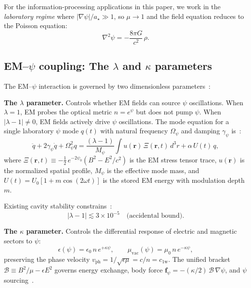 \documentclass[aps,prd,twocolumn,superscriptaddress,nofootinbib,floatfix]{revtex4-2}
\newcommand{\psifield}{\psi}
\newcommand{\cfield}{c_{\text{1w}}}
\newcommand{\cvac}{c}
\newcommand{\calB}{\mathcal{B}}
\begin{document}
For the information-processing applications in this paper, we work
in the \emph{laboratory regime} where
$|\nabla\psifield|/a_\star \gg 1$, so $\mu \to 1$ and the field
equation reduces to the Poisson equation:
\begin{equation}
\nabla^2\psifield = -\frac{8\pi G}{\cvac^2}\,\rho.
\label{eq:poisson_limit}
\end{equation}

\subsection{EM--$\psifield$ coupling: The $\lambda$ and $\kappa$ parameters}
\label{subsec:lambda_kappa}

The EM--$\psifield$ interaction is governed by two dimensionless
parameters~\cite{Alcock2025EMCoupling,Alcock2025DFD}:

\textbf{The $\lambda$ parameter.} Controls whether EM fields
can source $\psifield$ oscillations. When $\lambda = 1$, EM
probes the optical metric $n = e^{\psifield}$ but does not pump
$\psifield$. When $|\lambda - 1| \neq 0$, EM fields actively
drive $\psifield$ oscillations. The mode equation for a single
laboratory $\psifield$ mode $q(t)$ with natural frequency
$\Omega_\psi$ and damping $\gamma_\psi$ is~\cite{Alcock2025EMCoupling}:
\begin{equation}
\ddot{q} + 2\gamma_\psi\dot{q} + \Omega_\psi^2 q
= \frac{(\lambda-1)}{M_\psi}\int u(\mathbf{r})\,
\Xi(\mathbf{r},t)\,d^3r + \alpha\,U(t)\,q,
\label{eq:mode_equation}
\end{equation}
where $\Xi(\mathbf{r},t) \equiv -\tfrac{1}{2}\,e^{-2\psifield_0}
(B^2 - E^2/\cvac^2)$ is the EM stress tensor trace, $u(\mathbf{r})$
is the normalized spatial profile, $M_\psi$ is the effective mode
mass, and $U(t) = U_0[1 + m\cos(2\omega t)]$ is the stored EM
energy with modulation depth $m$.

Existing cavity stability constrains~\cite{Alcock2025EMCoupling}:
\begin{equation}
|\lambda - 1| \lesssim 3\times 10^{-5}
\quad\text{(accidental bound)}.
\label{eq:lambda_bound}
\end{equation}

\textbf{The $\kappa$ parameter.} Controls the differential
response of electric and magnetic sectors to $\psifield$:
\begin{equation}
\epsilon(\psifield) = \epsilon_0\,n\,e^{+\kappa\psifield},
\qquad
\mu_{\text{vac}}(\psifield) = \mu_0\,n\,e^{-\kappa\psifield},
\label{eq:kappa_split}
\end{equation}
preserving the phase velocity $v_{\text{ph}} = 1/\sqrt{\epsilon\mu}
= \cvac/n = \cfield$. The unified bracket
$\calB \equiv B^2/\mu - \epsilon E^2$ governs energy exchange,
body force $\mathbf{f}_\psi = -(\kappa/2)\,\calB\,\nabla\psifield$,
and $\psifield$ sourcing~\cite{Alcock2025DFD}.
\end{document}
